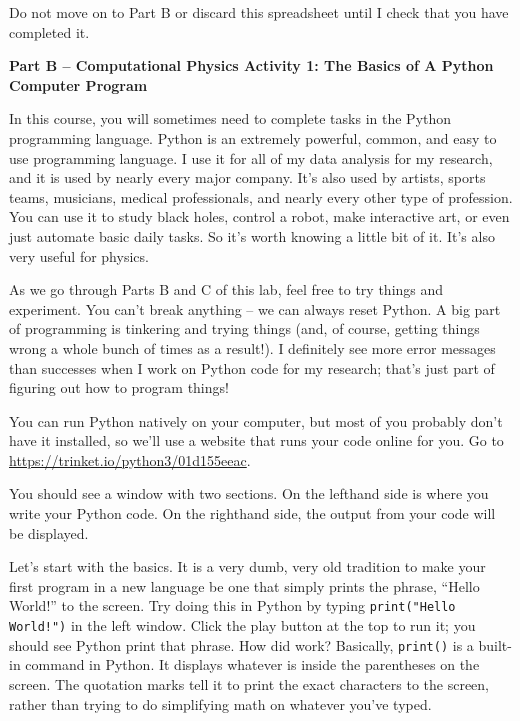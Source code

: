 \documentclass[10pt]{article}
\begin{document}
Do not move on to Part B or discard this spreadsheet until I check that you have completed it.

\newpage

\begin{center}
{\bf{Part B -- Computational Physics Activity 1: The Basics of A Python Computer Program}} 
\end{center}

In this course, you will sometimes need to complete tasks in the Python programming language. Python is an extremely powerful, common, and easy to use programming language. I use it for all of my data analysis for my research, and it is used by nearly every major company. It's also used by artists, sports teams, musicians, medical professionals, and nearly every other type of profession. You can use it to study black holes, control a robot, make interactive art, or even just automate basic daily tasks. So it's worth knowing a little bit of it. It's also very useful for physics.

As we go through Parts B and C of this lab, feel free to try things and experiment. You can't break anything -- we can always reset Python. A big part of programming is tinkering and trying things (and, of course, getting things wrong a whole bunch of times as a result!). I definitely see more error messages than successes when I work on Python code for my research; that's just part of figuring out how to program things!

You can run Python natively on your computer, but most of you probably don't have it installed, so we'll use a website that runs your code online for you. Go to \url{https://trinket.io/python3/01d155eeac}.

You should see a window with two sections. On the lefthand side is where you write your Python code. On the righthand side, the output from your code will be displayed.

Let's start with the basics. It is a very dumb, very old tradition to make your first program in a new language be one that simply prints the phrase, ``Hello World!'' to the screen. Try doing this in Python by typing \texttt{print("Hello World!")} in the left window. Click the play button at the top to run it; you should see Python print that phrase. How did work? Basically, \texttt{print()} is a built-in command in Python. It displays whatever is inside the parentheses on the screen. The quotation marks tell it to print the exact characters to the screen, rather than trying to do simplifying math on whatever you've typed.
\end{document}
